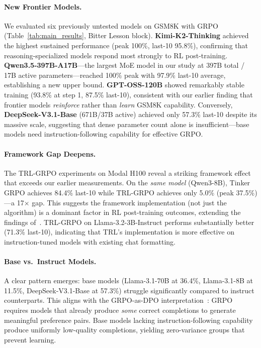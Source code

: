 \documentclass{article}
\begin{document}
\paragraph{New Frontier Models.}
We evaluated six previously untested models on GSM8K with GRPO (Table~\ref{tab:main_results}, Bitter Lesson block).
\textbf{Kimi-K2-Thinking} achieved the highest sustained performance (peak 100\%, last-10 95.8\%), confirming that reasoning-specialized models respond most strongly to RL post-training.
\textbf{Qwen3.5-397B-A17B}---the largest MoE model in our study at 397B total / 17B active parameters---reached 100\% peak with 97.9\% last-10 average, establishing a new upper bound.
\textbf{GPT-OSS-120B} showed remarkably stable training (93.8\% at step 1, 87.5\% last-10), consistent with our earlier finding that frontier models \emph{reinforce} rather than \emph{learn} GSM8K capability.
Conversely, \textbf{DeepSeek-V3.1-Base} (671B/37B active) achieved only 57.3\% last-10 despite its massive scale, suggesting that dense parameter count alone is insufficient---base models need instruction-following capability for effective GRPO.

\paragraph{Framework Gap Deepens.}
The TRL-GRPO experiments on Modal H100 reveal a striking framework effect that exceeds our earlier measurements.
On the \emph{same model} (Qwen3-8B), Tinker GRPO achieves 84.4\% last-10 while TRL-GRPO achieves only 5.0\% (peak 37.5\%)---a 17$\times$ gap.
This suggests the framework implementation (not just the algorithm) is a dominant factor in RL post-training outcomes, extending the findings of~\citet{henderson2018deep}.
TRL-GRPO on Llama-3.2-3B-Instruct performs substantially better (71.3\% last-10), indicating that TRL's implementation is more effective on instruction-tuned models with existing chat formatting.

\paragraph{Base vs.~Instruct Models.}
A clear pattern emerges: base models (Llama-3.1-70B at 36.4\%, Llama-3.1-8B at 11.5\%, DeepSeek-V3.1-Base at 57.3\%) struggle significantly compared to instruct counterparts.
This aligns with the GRPO-as-DPO interpretation~\cite{wu2025grpodpo}: GRPO requires models that already produce \emph{some} correct completions to generate meaningful preference pairs.
Base models lacking instruction-following capability produce uniformly low-quality completions, yielding zero-variance groups that prevent learning.
\end{document}
